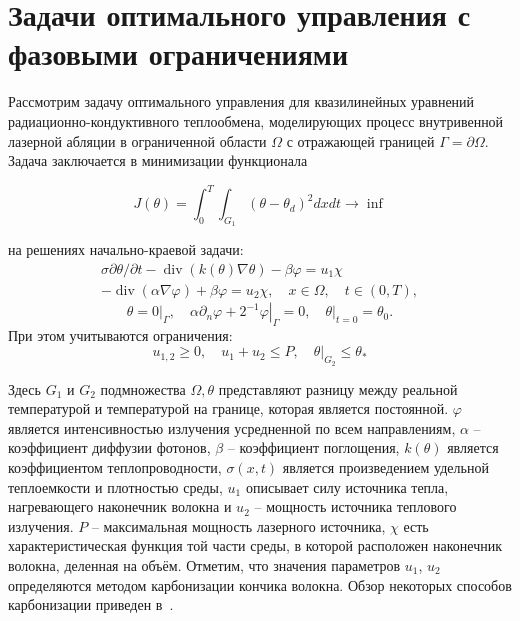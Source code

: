 \section{Задачи оптимального управления с фазовыми ограничениями}
\label{sec:ch3:sec2}
%
Рассмотрим задачу оптимального
управления для квазилинейных уравнений радиационно-кондуктивного
теплообмена, моделирующих процесс внутривенной
лазерной абляции в ограниченной области $\Omega$ с отражающей границей $\Gamma=\partial\Omega$.
Задача заключается в минимизации функционала

\[ J(\theta)=\int_{0}^{T} \int_{G_{1}}\left(\theta-\theta_{d}\right)^{2} dx dt \rightarrow \inf \]

на решениях начально-краевой задачи:
\begin{equation}
    \label{eq:3_2:1}
    \begin{gathered}
        \sigma \partial \theta / \partial t-\operatorname{div}(k(\theta)
        \nabla \theta)-\beta \varphi=u_{1} \chi \\
        -\operatorname{div}(\alpha \nabla \varphi)+\beta \varphi=u_{2}
        \chi, \quad x \in \Omega, \quad t \in(0, T),
    \end{gathered}
\end{equation}
\begin{equation}
    \label{eq:3_2:2}
    \theta=\left.0\right|_{\Gamma},
    \quad \alpha \partial_{n} \varphi
    +\left.2^{-1} \varphi\right|_{\Gamma}=0,
    \left.\quad \theta\right|_{t=0}=\theta_{0}.
\end{equation}
При этом учитываются ограничения:
\[ u_{1,2} \geq 0, \quad u_{1}+u_{2} \leq P, \left.\quad \theta\right|_{G_{2}} \leq \theta_{*} \]

Здесь $G_{1}$ и $G_{2}$ подмножества $\Omega, \theta$
представляют разницу между реальной температурой
и температурой на границе, которая является постоянной.
$\varphi$ является интенсивностью излучения усредненной по всем направлениям,
$\alpha$ -- коэффициент диффузии фотонов, $\beta$ -- коэффициент поглощения,
$k(\theta)$ является коэффициентом теплопроводности, $\sigma(x, t)$
является произведением удельной теплоемкости и плотностью среды, $u_{1}$
описывает силу источника тепла, нагревающего наконечник волокна и $u_{2}$
-- мощность источника теплового излучения.
$P$ -- максимальная мощность лазерного источника,
$\chi$ есть характеристическая функция той части среды,
в которой расположен наконечник волокна,
деленная на объём.
Отметим, что значения параметров $u_{1}$, $u_{2}$
определяются методом карбонизации кончика волокна.
Обзор некоторых способов карбонизации приведен в~\cite{Optimal_Kovtanyuk2020}.

